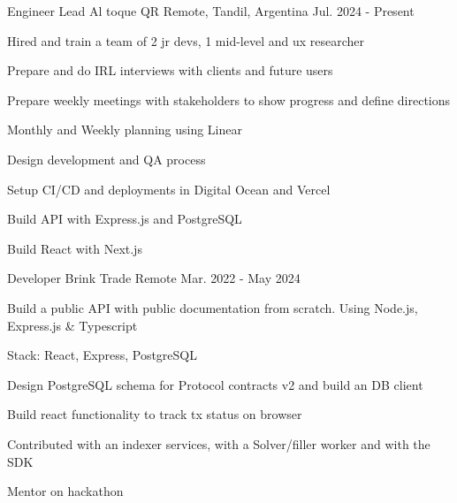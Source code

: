


\begin{cventries}
\cventry
{Engineer Lead} %
{Al toque QR} %
{Remote, Tandil, Argentina} %
{Jul. 2024 - Present} %
{ %
\begin{cvitems}
\item {Hired and train a team of 2 jr devs, 1 mid-level and ux researcher}
\item {Prepare and do IRL interviews with clients and future users}
\item {Prepare weekly meetings with stakeholders to show progress and define directions}
\item {Monthly and Weekly planning using Linear}
\item {Design development and QA process}
\item {Setup CI/CD and deployments in Digital Ocean and Vercel}
\item {Build API with Express.js and PostgreSQL}
\item {Build React with Next.js}
\end{cvitems}
}
\cventry
{Developer} %
{Brink Trade} %
{Remote} %
{Mar. 2022 - May 2024} %
{ %
\begin{cvitems}
\item {Build a public API with public documentation from scratch. Using Node.js, Express.js \& Typescript}
\item {Stack: React, Express, PostgreSQL}
\item {Design PostgreSQL schema for Protocol contracts v2 and build an DB client}
\item {Build react functionality to track tx status on browser}
\item {Contributed with an indexer services, with a Solver/filler worker and with the SDK}
\item {Mentor on hackathon}

\end{cvitems}}
\end{cventries}
